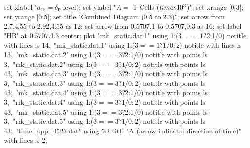   set xlabel "$a_{15} = δₚ$ level";
  set ylabel "$A = $ T Cells ($\\times 10^3$)";
  set xrange [0:3];
  set yrange [0:5];
  set title "Combined Diagram (0.5 to 2.3)";
  set arrow from 2.7,4.55 to 2.92,4.55 as 12;
  set arrow from 0.5707,1 to 0.5707,0.3 as 16;
  set label "HB" at 0.5707,1.3 center;
  plot "mk_static.dat.1" using 1:($3==1?$2:1/0) notitle with lines ls 14,\
       "mk_static.dat.1" using 1:($3==1?1/0:$2) notitle with lines ls 13,\
       "mk_static.dat.2" using 1:($3==3?$2:1/0) notitle with points ls 3,\
       "mk_static.dat.2" using 1:($3==3?1/0:$2) notitle with points ls 43,\
       "mk_static.dat.3" using 1:($3==3?$2:1/0) notitle with points ls 3,\
       "mk_static.dat.3" using 1:($3==3?1/0:$2) notitle with points ls 43,\
       "mk_static.dat.4" using 1:($3==3?$2:1/0) notitle with points ls 3,\
       "mk_static.dat.4" using 1:($3==3?1/0:$2) notitle with points ls 43,\
       "mk_static.dat.5" using 1:($3==3?$2:1/0) notitle with points ls 3,\
       "mk_static.dat.5" using 1:($3==3?1/0:$2) notitle with points ls 43,\
       "time_xpp_0523.dat" using 5:2 title "A (arrow indicates direction of time)" with lines ls 2;
\stopGNUPLOTscript

